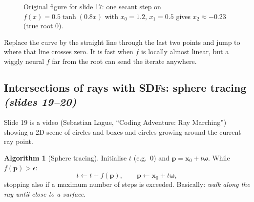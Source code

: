 \documentclass[11pt,a4paper]{article}
\newcommand{\bx}{\bm{x}}
\newcommand{\bp}{{\bm{p}}}
\newcommand{\bom}{{\bm{\omega}}}
\theoremstyle{definition}
\newtheorem{algorithm}{Algorithm}[section]
\theoremstyle{plain}
\theoremstyle{remark}
\begin{document}
\begin{figure}[htbp]
\centering
{}
\caption{Original figure for slide 17: one secant step on $f(x)=0.5\tanh(0.8x)$ with $x_0=1.2$, $x_1=0.5$ gives $x_2\approx-0.23$ (true root $0$).}
\end{figure}
\begin{intuition}
Replace the curve by the straight line through the last two points and jump to where that line crosses zero. It is
fast when $f$ is locally almost linear, but a wiggly neural $f$ far from the root can send the iterate anywhere.
\end{intuition}

\subsection{Intersections of rays with SDFs: sphere tracing \emph{(slides 19--20)}}
Slide 19 is a video (Sebastian Lague, ``Coding Adventure: Ray Marching'') showing a 2D scene of circles and boxes
and circles growing around the current ray point.


\begin{algorithm}[Sphere tracing]\label{alg:sphere}
Initialise $t$ (e.g.\ $0$) and $\bp=\bx_0+t\bom$. While $f(\bp)>\epsilon$:
\[
t\leftarrow t+f(\bp),\qquad \bp\leftarrow\bx_0+t\bom,
\]
stopping also if a maximum number of steps is exceeded. Basically: \emph{walk along the ray until close to a surface}.
\end{algorithm}
\end{document}
